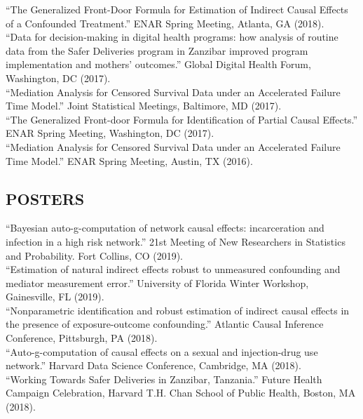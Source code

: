 \documentclass[12pt]{article}
\begin{document}
``The Generalized Front-Door Formula for Estimation of Indirect Causal Effects of a Confounded Treatment.'' ENAR Spring Meeting, Atlanta, GA (2018). \\

``Data for decision-making in digital health programs: how analysis of routine data from the Safer Deliveries program in Zanzibar improved program implementation and mothers' outcomes.'' Global Digital Health Forum, Washington, DC (2017). \\

``Mediation Analysis for Censored Survival Data under an Accelerated Failure Time Model.'' Joint Statistical Meetings, Baltimore, MD (2017). \\

``The Generalized Front-door Formula for Identification of Partial Causal Effects.'' ENAR Spring Meeting, Washington, DC (2017). \\

``Mediation Analysis for Censored Survival Data under an Accelerated Failure Time Model.'' ENAR Spring Meeting, Austin, TX (2016). 

\subsection*{\textbf{POSTERS}}

``Bayesian auto-g-computation of network causal effects: incarceration and infection in a high risk network.'' 21st Meeting of New Researchers in 
Statistics and Probability. Fort Collins, CO (2019). \\

``Estimation of natural indirect effects robust to unmeasured confounding and mediator measurement error.'' University of Florida Winter Workshop, Gainesville, FL (2019). \\

``Nonparametric identification and robust estimation of indirect causal effects in the presence of exposure-outcome confounding.'' Atlantic Causal Inference Conference, Pittsburgh, PA (2018). \\

``Auto-g-computation of causal effects on a sexual and injection-drug use network.'' Harvard Data Science Conference, Cambridge, MA (2018). \\

``Working Towards Safer Deliveries in Zanzibar, Tanzania.'' Future Health Campaign Celebration, Harvard T.H. Chan School of Public Health, Boston, MA (2018). \\
\end{document}
